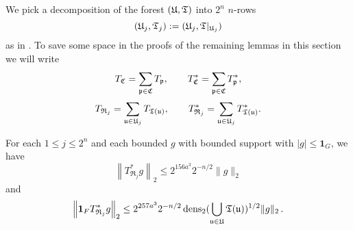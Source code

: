 We pick a decomposition of the forest $({\mathfrak U}, {\mathfrak T})$ into $2^n$ $n$-rows
\begin{equation*}
({\mathfrak U}_j, {\mathfrak T}_j) := ({\mathfrak U}_j, {\mathfrak T}|_{{\mathfrak U}_j})
\end{equation*}
as in . To save some space in the proofs of the remaining lemmas in this section we will write
    $$
        T_{{\mathfrak C}} = \sum_{{\mathfrak p} \in {\mathfrak C}} T_{{\mathfrak p}},\qquad T_{{\mathfrak C}}^* = \sum_{{\mathfrak p} \in {\mathfrak C}} T_{{\mathfrak p}}^*,
    $$
    $$
        T_{\mathfrak{R}_j} = \sum_{{\mathfrak u} \in {\mathfrak U}_j} T_{{\mathfrak T}({\mathfrak u})},\qquad T_{\mathfrak{R}_j}^* = \sum_{{\mathfrak u} \in {\mathfrak U}_j} T_{{\mathfrak T}({\mathfrak u})}^*.
    $$
\begin{lemma}
    \label{row-bound}
    \leanok
    For each $1 \le j \le 2^n$ and each bounded $g$ with bounded support with $|g| \le \mathbf{1}_G$, we have
    \begin{equation}
        \label{eq-row-bound-1}
        \left\| T_{\mathfrak{R}_j}^*g \right\|_2 \le 2^{156a^3} 2^{-n/2} \|g\|_2
    \end{equation}
    and
    \begin{equation}
        \label{eq-row-bound-2}
        \left\| \mathbf{1}_F T_{\mathfrak{R}_j}^*g \right\|_2 \le 2^{257a^3} 2^{-n/2} \operatorname{\operatorname{dens}}_2(\bigcup_{{\mathfrak u}\in {\mathfrak U}}{\mathfrak T}({\mathfrak u}))^{1/2} \|g\|_2\,.
    \end{equation}
\end{lemma}

